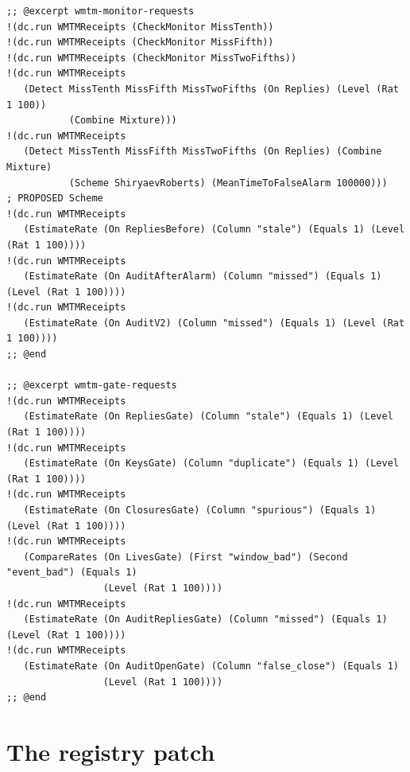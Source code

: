 \documentclass[11pt]{article}
\theoremstyle{definition}
\theoremstyle{plain}
\begin{document}
\begin{lstlisting}[style=mettafull]
;; @excerpt wmtm-monitor-requests
!(dc.run WMTMReceipts (CheckMonitor MissTenth))
!(dc.run WMTMReceipts (CheckMonitor MissFifth))
!(dc.run WMTMReceipts (CheckMonitor MissTwoFifths))
!(dc.run WMTMReceipts
   (Detect MissTenth MissFifth MissTwoFifths (On Replies) (Level (Rat 1 100))
           (Combine Mixture)))
!(dc.run WMTMReceipts
   (Detect MissTenth MissFifth MissTwoFifths (On Replies) (Combine Mixture)
           (Scheme ShiryaevRoberts) (MeanTimeToFalseAlarm 100000)))   ; PROPOSED Scheme
!(dc.run WMTMReceipts
   (EstimateRate (On RepliesBefore) (Column "stale") (Equals 1) (Level (Rat 1 100))))
!(dc.run WMTMReceipts
   (EstimateRate (On AuditAfterAlarm) (Column "missed") (Equals 1) (Level (Rat 1 100))))
!(dc.run WMTMReceipts
   (EstimateRate (On AuditV2) (Column "missed") (Equals 1) (Level (Rat 1 100))))
;; @end

;; @excerpt wmtm-gate-requests
!(dc.run WMTMReceipts
   (EstimateRate (On RepliesGate) (Column "stale") (Equals 1) (Level (Rat 1 100))))
!(dc.run WMTMReceipts
   (EstimateRate (On KeysGate) (Column "duplicate") (Equals 1) (Level (Rat 1 100))))
!(dc.run WMTMReceipts
   (EstimateRate (On ClosuresGate) (Column "spurious") (Equals 1) (Level (Rat 1 100))))
!(dc.run WMTMReceipts
   (CompareRates (On LivesGate) (First "window_bad") (Second "event_bad") (Equals 1)
                 (Level (Rat 1 100))))
!(dc.run WMTMReceipts
   (EstimateRate (On AuditRepliesGate) (Column "missed") (Equals 1) (Level (Rat 1 100))))
!(dc.run WMTMReceipts
   (EstimateRate (On AuditOpenGate) (Column "false_close") (Equals 1)
                 (Level (Rat 1 100))))
;; @end
\end{lstlisting}
\section{The registry patch}\label{app:registry}
\end{document}
